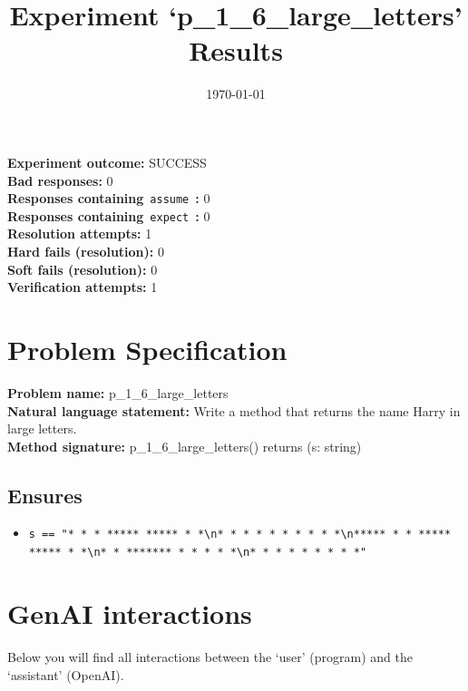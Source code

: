 \documentclass{article}
\begin{document}
\title{Experiment `p\_1\_6\_large\_letters' Results}
\author{\today}
\date{}
\maketitle
\textbf{Experiment outcome: }SUCCESS
\\\textbf{Bad responses: }0
\\\textbf{Responses containing}~\texttt{assume}~\textbf{: }0
\\\textbf{Responses containing}~\texttt{expect}~\textbf{: }0
\\\textbf{Resolution attempts: }1
\\\textbf{Hard fails (resolution): }0
\\\textbf{Soft fails (resolution): }0
\\\textbf{Verification attempts: }1
\section*{Problem Specification}
\textbf{Problem name: }p\_1\_6\_large\_letters
\\\textbf{Natural language statement: }Write a method that returns the name Harry in large letters.
\\\textbf{Method signature: }p\_1\_6\_large\_letters() returns (s: string)
\subsection*{Ensures}
\begin{itemize}
\item \texttt{s == "*   *      *      *****    *****    *     *\textbackslash{}n*   *     * *     *    *   *    *    *   *\textbackslash{}n*****    *   *    *****    *****      * *\textbackslash{}n*   *   *******   *    *   *    *      *\textbackslash{}n*   *  *       *  *     *  *     *     *"}
\end{itemize}
\clearpage
\section*{GenAI interactions}
Below you will find all interactions between the `user' (program) and the `assistant' (OpenAI).
\end{document}

